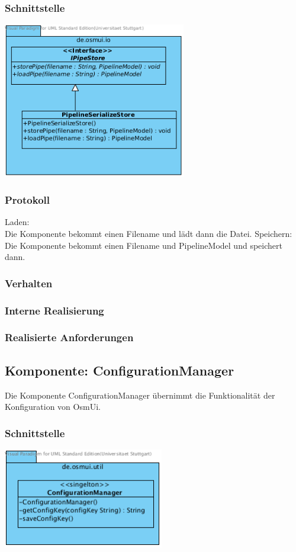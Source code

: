 \documentclass[a4paper,12pt]{scrartcl}
\begin{document}
\subsubsection{Schnittstelle}
\begin{center}
\includegraphics[width=8cm]{Schnittstelle_IPipeStore.png}
\end{center}
\subsubsection{Protokoll}
Laden: \\
Die Komponente bekommt einen Filename und lädt dann die Datei.
Speichern: \\
Die Komponente bekommt einen Filename und PipelineModel und speichert dann.
\subsubsection{Verhalten}
\subsubsection{Interne Realisierung}
\subsubsection{Realisierte Anforderungen}

\subsection{Komponente: ConfigurationManager}
Die Komponente ConfigurationManager übernimmt die Funktionalität der Konfiguration von OsmUi.
\subsubsection{Schnittstelle}
\begin{center}
\includegraphics[width=7cm]{Schnittstelle_ConfigurationManager.png}
\end{center}
\end{document}
